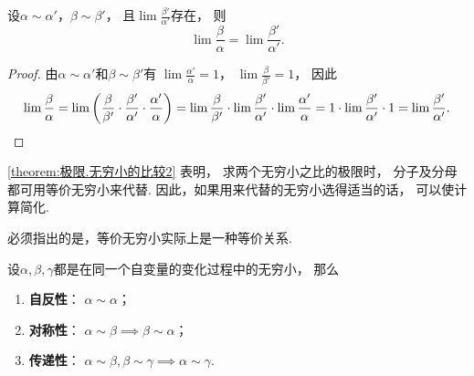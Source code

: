 \begin{theorem}\label{theorem:极限.无穷小的比较2}
设\(\alpha\sim\alpha'\)，\(\beta\sim\beta'\)，
且\(\lim\frac{\beta'}{\alpha'}\)存在，
则\[
	\lim\frac{\beta}{\alpha}=\lim\frac{\beta'}{\alpha'}.
\]
\begin{proof}
由\(\alpha\sim\alpha'\)和\(\beta\sim\beta'\)有
\(\lim\frac{\alpha'}{\alpha} = 1\)，
\(\lim\frac{\beta}{\beta'} = 1\)，
因此\[
	\lim\frac{\beta}{\alpha}
	= \lim \left(
		\frac{\beta}{\beta'}
		\cdot \frac{\beta'}{\alpha'}
		\cdot \frac{\alpha'}{\alpha}
	\right)
	= \lim\frac{\beta}{\beta'}
		\cdot \lim \frac{\beta'}{\alpha'}
		\cdot \lim\frac{\alpha'}{\alpha}
	= 1 \cdot \lim \frac{\beta'}{\alpha'} \cdot 1
	= \lim \frac{\beta'}{\alpha'}.
	\qedhere
\]
\end{proof}
\end{theorem}
\cref{theorem:极限.无穷小的比较2} 表明，
求两个无穷小之比的极限时，
分子及分母都可用等价无穷小来代替.
因此，如果用来代替的无穷小选得适当的话，
可以使计算简化.

必须指出的是，等价无穷小实际上是一种等价关系.
\begin{property}\label{theorem:极限.无穷小的比较6}
设\(\alpha,\beta,\gamma\)都是在同一个自变量的变化过程中的无穷小，
那么\begin{enumerate}
	\item {\bf 自反性}：
	\(\alpha \sim \alpha\)；

	\item {\bf 对称性}：
	\(\alpha \sim \beta \implies \beta \sim \alpha\)；

	\item {\bf 传递性}：
	\(\alpha \sim \beta, \beta \sim \gamma \implies \alpha \sim \gamma\).
\end{enumerate}
\end{property}


